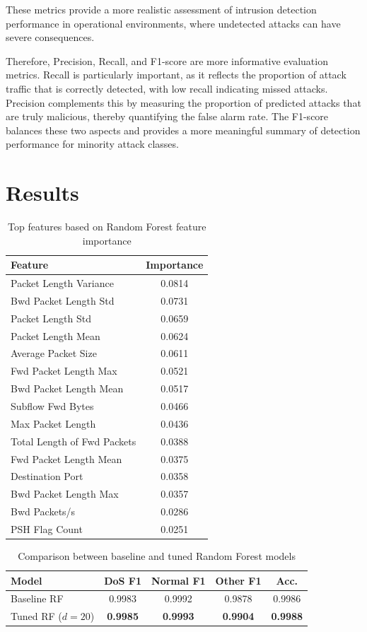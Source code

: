 \documentclass[conference]{IEEEtran}
\begin{document}
These metrics provide a more realistic assessment of intrusion detection performance in operational environments, where undetected attacks can have severe consequences.

Therefore, Precision, Recall, and F1-score are more informative evaluation metrics. Recall is particularly important, as it reflects the proportion of attack traffic that is correctly detected, with low recall indicating missed attacks. Precision complements this by measuring the proportion of predicted attacks that are truly malicious, thereby quantifying the false alarm rate. The F1-score balances these two aspects and provides a more meaningful summary of detection performance for minority attack classes.

\section{Results}

\begin{table}[h]
\centering
\caption{Top features based on Random Forest feature importance}
\label{tab:top_features}
\begin{tabular}{lc}
\toprule
Feature & Importance \\
\midrule
Packet Length Variance & 0.0814 \\
Bwd Packet Length Std & 0.0731 \\
Packet Length Std & 0.0659 \\
Packet Length Mean & 0.0624 \\
Average Packet Size & 0.0611 \\
Fwd Packet Length Max & 0.0521 \\
Bwd Packet Length Mean & 0.0517 \\
Subflow Fwd Bytes & 0.0466 \\
Max Packet Length & 0.0436 \\
Total Length of Fwd Packets & 0.0388 \\
Fwd Packet Length Mean & 0.0375 \\
Destination Port & 0.0358 \\
Bwd Packet Length Max & 0.0357 \\
Bwd Packets/s & 0.0286 \\
PSH Flag Count & 0.0251 \\
\bottomrule
\end{tabular}
\end{table}

\begin{table}[h]
\centering
\caption{Comparison between baseline and tuned Random Forest models}
\label{tab:model_comparison}
\begin{tabular}{lcccc}
\toprule
Model & DoS F1 & Normal F1 & Other F1 & Acc. \\
\midrule
Baseline RF & 0.9983 & 0.9992 & 0.9878 & 0.9986 \\
Tuned RF ($d=20$) & \textbf{0.9985} & \textbf{0.9993} & \textbf{0.9904} & \textbf{0.9988} \\
\bottomrule
\end{tabular}
\end{table}
\end{document}
